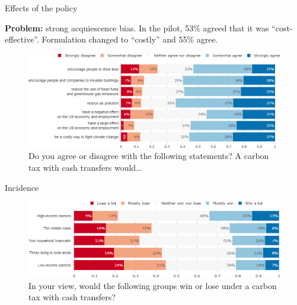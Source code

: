 \documentclass[aspectratio=169,9pt,dvipsnames]{beamer}
\begin{document}
\begin{frame}{Effects of the policy}%

\textbf{Problem:} strong acquiescence bias. In the pilot, 53\% agreed that it was ``cost-effective''. Formulation changed to ``costly'' and 55\% agree.

\begin{figure}[h!]
\centering
\caption{Do you agree or disagree with the following statements? A carbon tax with cash transfers would…}
\includegraphics[width=\textwidth]{../figures/US/tax_transfers_effect_US.png}
\end{figure}
\end{frame}

\begin{frame}{Incidence}%
\begin{figure}[h!]
\centering
\caption{In your view, would the following groups win or lose under a carbon tax with cash transfers?}
\includegraphics[width=\textwidth]{../figures/US/tax_transfers_win_lose_US.png}
\end{figure}
\end{frame}
\end{document}
